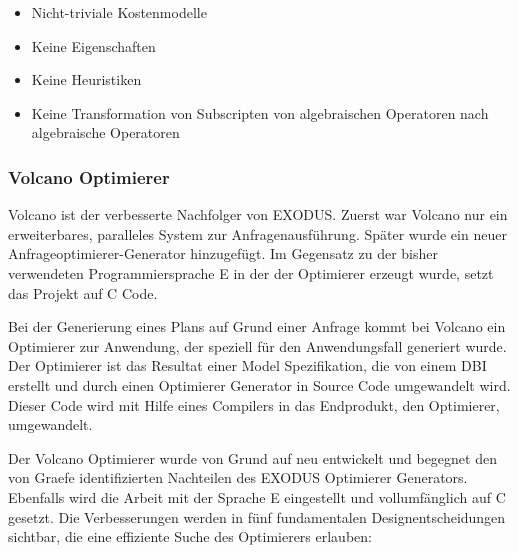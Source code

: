 \begin{itemize}
\item Nicht-triviale Kostenmodelle
\item Keine Eigenschaften
\item Keine Heuristiken
\item Keine Transformation von Subscripten von algebraischen Operatoren nach algebraische Operatoren
\end{itemize}


\subsubsection{Volcano Optimierer}

Volcano ist der verbesserte Nachfolger von EXODUS. Zuerst war Volcano nur ein erweiterbares, paralleles System zur Anfragenausführung. Später wurde ein neuer Anfrageoptimierer-Generator hinzugefügt. Im Gegensatz zu der bisher verwendeten Programmiersprache E in der der Optimierer erzeugt wurde, setzt das Projekt auf C Code. 


Bei der Generierung eines Plans auf Grund einer Anfrage kommt bei Volcano ein Optimierer zur Anwendung, der speziell für den Anwendungsfall generiert wurde. Der Optimierer ist das Resultat einer Model Spezifikation, die von einem \ac{DBI} erstellt und durch einen Optimierer Generator in Source Code umgewandelt wird. Dieser Code wird mit Hilfe eines Compilers in das Endprodukt, den Optimierer, umgewandelt.


Der Volcano Optimierer wurde von Grund auf neu entwickelt und begegnet den von Graefe identifizierten Nachteilen des EXODUS Optimierer Generators. Ebenfalls wird die Arbeit mit der Sprache E eingestellt und vollumfänglich auf C gesetzt. Die Verbesserungen werden in fünf fundamentalen Designentscheidungen\cite{graefe1993volcano} sichtbar, die eine effiziente Suche des Optimierers erlauben:


